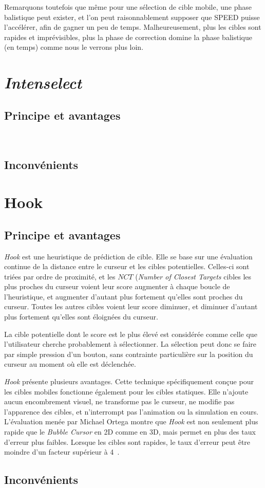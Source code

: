 	Remarquons toutefois que même pour une sélection de cible mobile, une phase balistique peut exister, et l'on peut raisonnablement supposer que SPEED puisse l'accélérer, afin de gagner un peu de temps. Malheureusement, plus les cibles sont rapides et imprévisibles, plus la phase de correction domine la phase balistique (en temps) comme nous le verrons plus loin.


\section{\emph{Intenselect}}
	\subsection{Principe et avantages}
	~\cite{de2005intenselect}
	
	\subsection{Inconvénients}
		
\section{Hook}
	\subsection{Principe et avantages}
	\emph{Hook} est une heuristique de prédiction de cible. Elle se base sur une évaluation continue de la distance entre le curseur et les cibles potentielles. Celles-ci sont triées par ordre de proximité, et les $NCT$ (\emph{Number of Closest Targets} cibles les plus proches du curseur voient leur score augmenter à chaque boucle de l'heuristique, et augmenter d'autant plus fortement qu'elles sont proches du curseur. Toutes les autres cibles voient leur score diminuer, et diminuer d'autant plus fortement qu'elles sont éloignées du curseur.
		
	La cible potentielle dont le score est le plus élevé est considérée comme celle que l'utilisateur cherche probablement à sélectionner. La sélection peut donc se faire par simple pression d'un bouton, sans contrainte particulière sur la position du curseur au moment où elle est déclenchée.
		
	\emph{Hook} présente plusieurs avantages. Cette technique spécifiquement conçue pour les cibles mobiles fonctionne également pour les cibles statiques. Elle n'ajoute aucun encombrement visuel, ne transforme pas le curseur, ne modifie pas l'apparence des cibles, et n'interrompt pas l'animation ou la simulation en cours. L'évaluation menée par Michael Ortega montre que \emph{Hook} est non seulement plus rapide que le \emph{Bubble Cursor} en 2D comme en 3D, mais permet en plus des taux d'erreur plus faibles. Lorsque les cibles sont rapides, le taux d'erreur peut être moindre d'un facteur supérieur à 4~\cite{ortega2013hook}.
	
	\subsection{Inconvénients}

\clearpage
